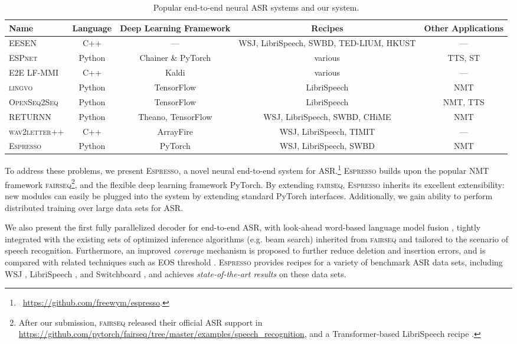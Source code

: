 \documentclass{article}
\def\espresso{\textsc{Espresso}\xspace}
\def\fairseq{\textsc{fairseq}\xspace}
\def\openseqseq{\textsc{OpenSeq2Seq}\xspace}
\def\espnet{\textsc{ESPnet}\xspace}
\def\eesen{\textsc{EESEN}\xspace}
\def\lingvo{\textsc{lingvo}\xspace}
\def\returnn{\textsc{RETURNN}\xspace}
\def\wavtoletterpp{\textsc{wav2letter++}\xspace}
\begin{document}
\begin{table*}[t!]
  \caption{Popular end-to-end neural ASR systems and our system.}
  \label{tab:e2e_systems}
  \centering
  \begin{adjustbox}{max width=\textwidth}
  \begin{tabular}{l c c c c}
    \toprule
    Name & Language & Deep Learning Framework & Recipes & Other Applications\\
    \midrule
    \eesen \cite{miao2015end} & C++ & --- & WSJ, LibriSpeech, SWBD, TED-LIUM, HKUST & ---\\
    \espnet \cite{watanabe2018espnet} & Python & Chainer \& PyTorch & various & TTS, ST\\
    E2E LF-MMI \cite{hadian2018end} & C++ & Kaldi & various & ---\\
    \lingvo \cite{shen2019lingvo} & Python & TensorFlow & LibriSpeech & NMT \\
    \openseqseq \cite{openseq2seq} & Python & TensorFlow & LibriSpeech & NMT, TTS \\
    \returnn \cite{zeyer2018returnn} & Python & Theano, TensorFlow & WSJ, LibriSpeech, SWBD, CHiME & NMT \\
    \wavtoletterpp \cite{pratap2019wav2letter} & C++ & ArrayFire & WSJ, LibriSpeech, TIMIT & ---\\
    \midrule
    \espresso & Python & PyTorch & WSJ, LibriSpeech, SWBD & NMT \\
    \bottomrule
  \end{tabular}
  \end{adjustbox}
\end{table*}
To address these problems, we present \espresso, a novel neural end-to-end system for ASR.\footnote{~\url{https://github.com/freewym/espresso}.} \espresso builds upon the popular NMT framework \fairseq\footnote{After our submission, \fairseq released their official ASR support in \url{https://github.com/pytorch/fairseq/tree/master/examples/speech_recognition}, and a Transformer-based LibriSpeech recipe \cite{mohamed2019transformers}.}, and the flexible deep learning framework PyTorch. By extending \fairseq, \espresso inherits its excellent extensibility: new modules can easily be plugged into the system by extending standard PyTorch interfaces. Additionally, we gain ability to perform distributed training over large data sets for ASR.

We also present the first fully parallelized decoder for end-to-end ASR, with look-ahead word-based language model fusion \cite{hori2018endtoend}, tightly integrated with the existing sets of optimized inference algorithms (e.g. beam search) inherited from \fairseq and tailored to the scenario of speech recognition. Furthermore, an improved {\em coverage} mechanism is proposed to further reduce deletion and insertion errors, and is compared with related techniques such as EOS threshold \cite{hannun2019sequence}. \espresso provides recipes for a variety of benchmark ASR data sets, including WSJ \cite{paulb92}, LibriSpeech \cite{panayotovcpk15}, and Switchboard \cite{godfrey1992switchboard}, and achieves \emph{state-of-the-art results} on these data sets.
\end{document}
